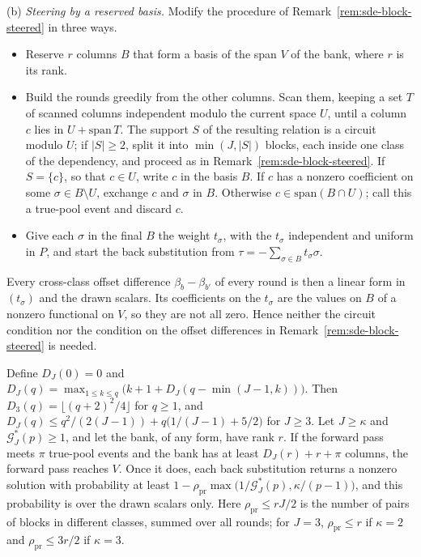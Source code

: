 \begin{remark}
\textup{(b)} \emph{Steering by a reserved basis.} Modify the procedure of Remark~\ref{rem:sde-block-steered} in three ways.
\begin{itemize}
\item Reserve $r$ columns $B$ that form a basis of the span $V$ of the bank, where $r$ is its rank.
\item Build the rounds greedily from the other columns. Scan them, keeping a set $T$ of scanned columns independent modulo the current space $U$, until a column $c$ lies in $U+\mathrm{span}\,T$. The support $S$ of the resulting relation is a circuit modulo $U$; if $|S|\ge2$, split it into $\min(J,|S|)$ blocks, each inside one class of the dependency, and proceed as in Remark~\ref{rem:sde-block-steered}. If $S=\{c\}$, so that $c\in U$, write $c$ in the basis $B$. If $c$ has a nonzero coefficient on some $\sigma\in B\setminus U$, exchange $c$ and $\sigma$ in $B$. Otherwise $c\in\mathrm{span}(B\cap U)$; call this a true-pool event and discard $c$.
\item Give each $\sigma$ in the final $B$ the weight $t_\sigma$, with the $t_\sigma$ independent and uniform in $P$, and start the back substitution from $\tau=-\sum_{\sigma\in B}t_\sigma\sigma$.
\end{itemize}
Every cross-class offset difference $\beta_b-\beta_{b'}$ of every round is then a linear form in $(t_\sigma)$ and the drawn scalars. Its coefficients on the $t_\sigma$ are the values on $B$ of a nonzero functional on $V$, so they are not all zero. Hence neither the circuit condition nor the condition on the offset differences in Remark~\ref{rem:sde-block-steered} is needed.

Define $D_J(0)=0$ and $D_J(q)=\max_{1\le k\le q}\bigl(k+1+D_J(q-\min(J-1,k))\bigr)$. Then $D_3(q)=\lfloor(q+2)^2/4\rfloor$ for $q\ge1$, and $D_J(q)\le q^2/(2(J-1))+q\bigl(1/(J-1)+5/2\bigr)$ for $J\ge3$. Let $J\ge\kappa$ and $\mathcal{G}^*_J(p)\ge1$, and let the bank, of any form, have rank $r$. If the forward pass meets $\pi$ true-pool events and the bank has at least $D_J(r)+r+\pi$ columns, the forward pass reaches $V$. Once it does, each back substitution returns a nonzero solution with probability at least $1-\rho_{\mathrm{pr}}\max\bigl(1/\mathcal{G}^*_J(p),\kappa/(p-1)\bigr)$, and this probability is over the drawn scalars only. Here $\rho_{\mathrm{pr}}\le rJ/2$ is the number of pairs of blocks in different classes, summed over all rounds; for $J=3$, $\rho_{\mathrm{pr}}\le r$ if $\kappa=2$ and $\rho_{\mathrm{pr}}\le3r/2$ if $\kappa=3$.


\end{remark}
